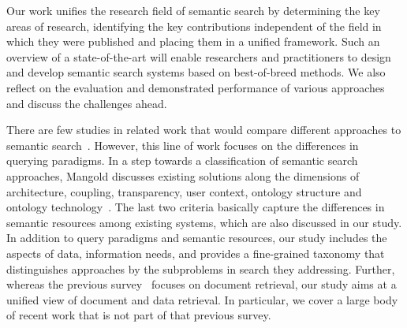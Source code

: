 
Our work unifies the research field of semantic search by determining the key areas of research, identifying the key contributions independent of the field in which they were published and placing them in a unified framework. Such an overview of a state-of-the-art will enable researchers and practitioners to design and develop semantic search systems based on best-of-breed methods. We also reflect on the evaluation and demonstrated performance of various approaches and discuss the challenges ahead.

There are few studies in related work that would compare different approaches to semantic search~\cite{DBLP:conf/semweb/KaufmannB07,DBLP:conf/esws/TranMH10}. However, this line of work focuses on the differences in querying paradigms. In a step towards a classification of semantic search approaches, Mangold discusses existing solutions along the dimensions of architecture, coupling, transparency, user context, ontology structure and ontology technology~\cite{DBLP:journals/ijmso/Mangold07}. The last two criteria basically capture the differences in semantic resources among existing systems, which are also discussed in our study. In addition to query paradigms and semantic resources, our study includes the aspects of data, information needs, and provides a fine-grained taxonomy that distinguishes approaches by the subproblems in search they addressing. Further, whereas the previous survey~\cite{DBLP:journals/ijmso/Mangold07} focuses on document retrieval, our study aims at a unified view of document and data retrieval. In particular, we cover a large body of recent work that is not part of that previous survey.  


